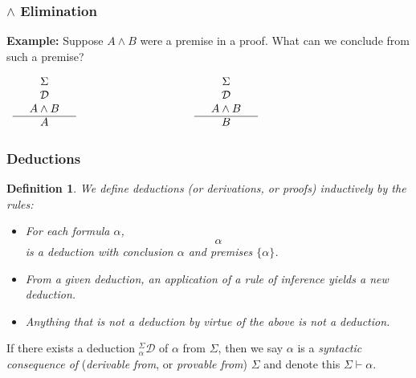 \documentclass{beamer}
\theoremstyle{indentDefn} \newtheorem{defn}[]{Definition}
\begin{document}
\begin{frame}
	\frametitle{$\land$ Elimination}
	
	{\bf Example:} Suppose $A\land B$ were a premise in a proof. What can we conclude from such a premise?
	
	\pause

	\vspace{2cm}
	
	\begin{center}
		$\begin{array} { c c c }
		
		\begin{array}{ c  c  c }			
			 & \Sigma & \\
			 & \mathcal{D} & \\
			 & A \land B & \\
			\cline{1 - 3}
			 & A &  \\ 	
		\end{array}

		& \hspace{3cm} &

		\begin{array}{ c  c  c }			
			 & \Sigma & \\
			 & \mathcal{D} &  \\
			 & A \land B &  \\
			\cline{1 - 3}
			 & B &  \\ 	
		\end{array}\\		

		\end{array}$
	\end{center}	
\end{frame}

\begin{frame}
	\frametitle{Deductions}
	
	\begin{defn} We define deductions (or derivations, or proofs) inductively by the rules: 
	
	\begin{itemize}
		\item For each formula $\alpha$,
		$$ \alpha $$
		is a deduction with conclusion $\alpha$ and premises $\{\alpha\}$.
		
		\item From a given deduction, an application of a \textit{rule of inference} yields a new deduction.
		
		\item Anything that is not a deduction by virtue of the above is \emph{not} a deduction. 
	\end{itemize}

	\end{defn}
	
	\vspace{0.3cm}

	If there exists a deduction $^\Sigma_{\alpha}\mathcal{D}$ of $\alpha$ from $\Sigma$, then we say $\alpha$ is a \textit{syntactic consequence of }(\textit{derivable from}, or \textit{provable from}) $\Sigma$ and denote this $\Sigma \vdash \alpha$. 
	
	
\end{frame}
\end{document}
